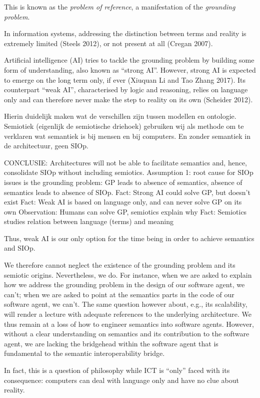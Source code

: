 \documentclass[a4paper,11pt,oneside,oldfontcommands]{memoir}
\theoremstyle{definition}
\theoremstyle{break}		%
\numberwithin{equation}{chapter}
\numberwithin{figure}{chapter}
\begin{document}
This is known as the \emph{problem of reference}, a manifestation of the
\emph{grounding problem}.

In information systems, addressing the distinction between terms and
reality is extremely limited (Steels 2012), or not present at all
(Cregan 2007).

Artificial intelligence (AI) tries to tackle the grounding problem by
building some form of understanding, also known as ``strong AI''.
However, strong AI is expected to emerge on the long term only, if ever
(Xiuquan Li and Tao Zhang 2017). Its counterpart ``weak AI'',
characterised by logic and reasoning, relies on language only and can
therefore never make the step to reality on its own (Scheider 2012).

Hierin duidelijk maken wat de verschillen zijn tussen modellen en
ontologie. Semiotiek (eigenlijk de semiotische driehoek) gebruiken wij
als methode om te verklaren wat semantiek is bij mensen en bij
computers. En zonder semantiek in de architectuur, geen SIOp.

CONCLUSIE: Architectures will not be able to facilitate semantics and,
hence, consolidate SIOp without including semiotics. Assumption 1: root
cause for SIOp issues is the grounding problem: GP leads to absence of
semantics, absence of semantics leads to absence of SIOp. Fact: Strong
AI could solve GP, but doesn't exist Fact: Weak AI is based on language
only, and can never solve GP on its own Observation: Humans can solve
GP, semiotics explain why Fact: Semiotics studies relation between
language (terms) and meaning

Thus, weak AI is our only option for the time being in order to achieve
semantics and SIOp.

We therefore cannot neglect the existence of the grounding problem and
its semiotic origins. Nevertheless, we do. For instance, when we are
asked to explain how we address the grounding problem in the design of
our software agent, we can't; when we are asked to point at the
semantics parts in the code of our software agent, we can't. The same
question however about, e.g., its scalability, will render a lecture
with adequate references to the underlying architecture. We thus remain
at a loss of how to engineer semantics into software agents. However,
without a clear understanding on semantics and its contribution to the
software agent, we are lacking the bridgehead within the software agent
that is fundamental to the semantic interoperability bridge.

In fact, this is a question of philosophy while ICT is ``only'' faced
with its consequence: computers can deal with language only and have no
clue about reality.
\end{document}
